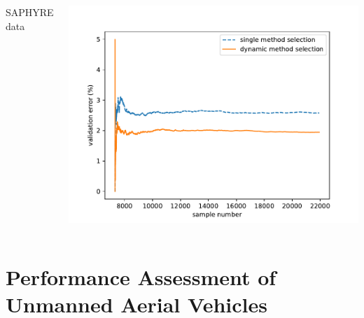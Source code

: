 \documentclass{beamer}
\begin{document}
\begin{frame}
\begin{columns}[c]
\begin{center}
SAPHYRE data
\end{center}
\includegraphics[width=\textwidth]{switching/saphyre/0.66/saphyre66}
\end{columns}

\end{frame}

\section{Performance Assessment of Unmanned Aerial Vehicles}
\end{document}
